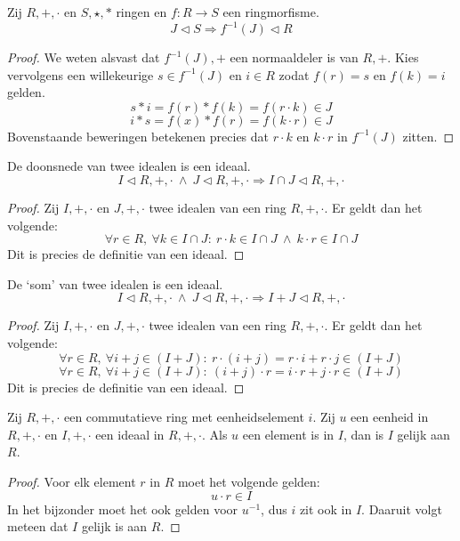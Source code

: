 \documentclass[main.tex]{subfiles}
\begin{document}
\begin{ei}
  \label{ei:invers-ringmorfisme-behoudt-ideaal-zijn}
  Zij $R,+,\cdot$ en $S,\star,*$ ringen en $f: R\rightarrow S$ een ringmorfisme.
  \[ J \triangleleft S \Rightarrow f^{-1}(J) \triangleleft R \]

  \begin{proof}
    We weten alsvast dat $f^{-1}(J),+$ een normaaldeler is van $R,+$.
    Kies vervolgens een willekeurige $s\in f^{-1}(J)$ en $i\in R$ zodat $f(r) = s$ en $f(k) = i$ gelden.
    \[ s * i = f(r) * f(k) = f(r\cdot k) \in J \]
    \[ i * s = f(x) * f(r) = f(k\cdot r) \in J \]
    Bovenstaande beweringen betekenen precies dat $r \cdot k$ en $k\cdot r$ in $f^{-1}(J)$ zitten.
  \end{proof}
\end{ei}

\begin{st}
  De doonsnede van twee idealen is een ideaal.
  \[ I \triangleleft R,+,\cdot\ \wedge\ J \triangleleft R,+,\cdot \Rightarrow I \cap J \triangleleft R,+,\cdot \]

  \begin{proof}
    Zij $I,+,\cdot$ en $J,+,\cdot$ twee idealen van een ring $R,+,\cdot$.
    Er geldt dan het volgende:
    \[ \forall r \in R,\ \forall k\in I\cap J:\ r\cdot k\in I \cap J\ \wedge\ k\cdot r \in I \cap J \]
    Dit is precies de definitie van een ideaal.
  \end{proof}
\end{st}

\begin{st}
  De `som' van twee idealen is een ideaal.
  \[ I \triangleleft R,+,\cdot\ \wedge\ J \triangleleft R,+,\cdot \Rightarrow I + J \triangleleft R,+,\cdot \]

  \begin{proof}
    Zij $I,+,\cdot$ en $J,+,\cdot$ twee idealen van een ring $R,+,\cdot$.
    Er geldt dan het volgende:
    \[ \forall r \in R,\ \forall i+j\in (I + J):\ r\cdot (i+j) = r\cdot i + r\cdot j \in (I+J) \]
    \[ \forall r \in R,\ \forall i+j\in (I + J):\ (i+j)\cdot r = i\cdot r + j\cdot r \in (I+J) \]
    Dit is precies de definitie van een ideaal.
  \end{proof}
\end{st}

\begin{st}
  Zij $R,+,\cdot$ een commutatieve ring met eenheidselement $i$.
  Zij $u$ een eenheid in $R,+,\cdot$ en $I,+,\cdot$ een ideaal in $R,+,\cdot$.
  Als $u$ een element is in $I$, dan is $I$ gelijk aan $R$.

  \begin{proof}
    Voor elk element $r$ in $R$ moet het volgende gelden:
    \[ u \cdot r \in I\]
    In het bijzonder moet het ook gelden voor $u^{-1}$, dus $i$ zit ook in $I$.
    Daaruit volgt meteen dat $I$ gelijk is aan $R$.
  \end{proof}
\end{st}
\end{document}
